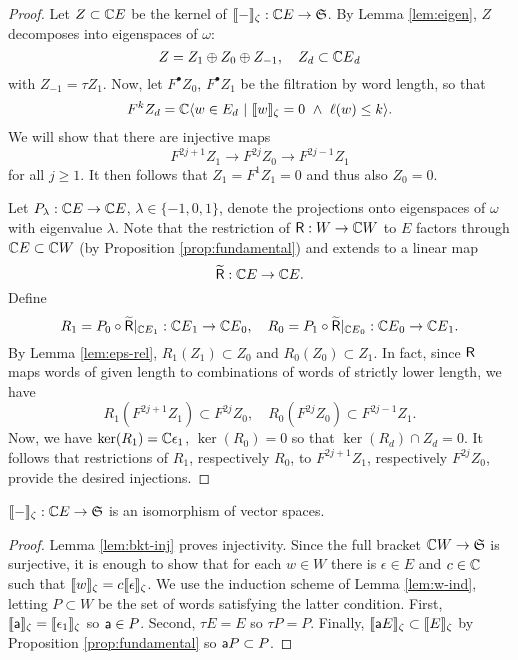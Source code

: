 \begin{proof} Let $Z\subset{{\mathbb{C}}{}E}$ be the kernel of $\llbracket{-}\rrbracket_\zeta : {{\mathbb{C}}{}E} \to \mathfrak{S}$. By Lemma \ref{lem:eigen},
$Z$ decomposes into eigenspaces of $\omega$:
\[
        Z = Z_1 \oplus Z_0 \oplus Z_{-1},\quad  Z_d \subset {{\mathbb{C}}{}E}_d
\]
with $Z_{-1}=\tau Z_1$. Now, let $F^\bullet Z_0$, $F^\bullet Z_1$ be the filtration by word length,
so that
\[
        F^k Z_d = {\mathbb{C}} \langle w \in E_d\ |\ \llbracket{w}\rrbracket_\zeta = 0\ \wedge\ \ell(w)\le k\rangle. 
\]
We will show that there are injective maps
\[
  F^{2j+1} Z_1 \to F^{2j} Z_0 \to F^{2j-1} Z_1
\]
for all $j \ge 1$. It then follows that $Z_1=F^1Z_1=0$ and thus also $Z_0 = 0$.

Let $P_\lambda : {{\mathbb{C}}{}E}\to{{\mathbb{C}}{}E}$, $\lambda\in\{-1,0,1\}$, denote the projections onto eigenspaces
of $\omega$ with eigenvalue $\lambda$. Note that the restriction of $\mathsf{R} : W \to {{\mathbb{C}}{}W}$ to $E$ factors
through ${{\mathbb{C}}{}E} \subset {{\mathbb{C}}{}W}$ (by Proposition \ref{prop:fundamental}) and extends to a linear map
\[
    \widetilde{\mathsf{R}} : {{\mathbb{C}}{}E} \to {{\mathbb{C}}{}E}.
\]
Define
\[
    R_1 = P_0 \circ \widetilde{\mathsf{R}}|_{{{\mathbb{C}}{}E}_1} : {{\mathbb{C}}{}E}_1\to{{\mathbb{C}}{}E}_0,\quad
    R_0 = P_1 \circ \widetilde{\mathsf{R}}|_{{{\mathbb{C}}{}E}_0} : {{\mathbb{C}}{}E}_0\to{{\mathbb{C}}{}E}_1.
\]
By Lemma \ref{lem:eps-rel}, $R_1(Z_1)\subset Z_0$ and $R_0(Z_0)\subset Z_1$. In fact, since $\mathsf{R}$ maps words
of given length to combinations of words of strictly lower length, we have
\[
    R_1(F^{2j+1}Z_1) \subset F^{2j}Z_0,\quad  R_0(F^{2j}Z_0) \subset F^{2j-1}Z_1.
\]
Now, we have $\ker(R_1) = {\mathbb{C}}\epsilon_1$, $\ker(R_0)= 0$ so that $\ker(R_d) \cap Z_d=0$. It follows
that restrictions of $R_1$, respectively $R_0$, to $F^{2j+1}Z_1$, respectively $F^{2j}Z_0$,
provide the desired injections. 
\end{proof}

\begin{prop} $\llbracket{-}\rrbracket_\zeta:{{\mathbb{C}}{}E}\to\mathfrak{S}$ is an isomorphism of vector spaces.\end{prop}

\begin{proof} Lemma \ref{lem:bkt-inj} proves injectivity. Since the full bracket ${{\mathbb{C}}{}W}\to\mathfrak{S}$ is 
surjective, it is enough to show that for each $w\in W$ there is $\epsilon \in E$ and $c\in{\mathbb{C}}$
such that $\llbracket{w}\rrbracket_\zeta=c\llbracket{\epsilon}\rrbracket_\zeta$. We use the induction scheme of Lemma \ref{lem:w-ind}, letting $P\subset W$
be the set of words satisfying the latter condition. First, $\llbracket{\mathsf{a}}\rrbracket_\zeta = \llbracket{\epsilon_1}\rrbracket_\zeta$ so $\mathsf{a} \in P$.
Second, $\tau E = E$ so $\tau P = P$. Finally, $\llbracket{\mathsf{a}E}\rrbracket_\zeta \subset \llbracket{E}\rrbracket_\zeta$ by Proposition \ref{prop:fundamental} so $\mathsf{a} P \subset P$.
\end{proof}

